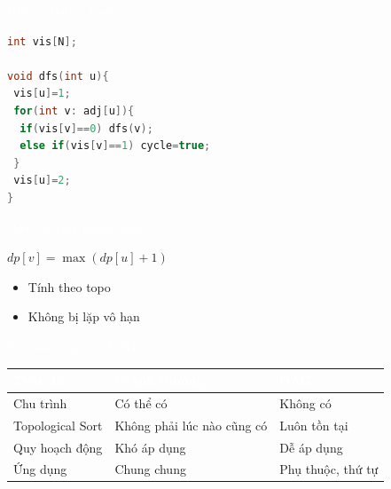 \documentclass{beamer}
\newcommand{\hlgreen}[1]{\textcolor{mygreen}{#1}}
\newcommand{\hlpurple}[1]{\textcolor{mypurple}{#1}}
\newcommand{\hlwhite}[1]{\textcolor{white}{#1}}
\begin{document}

\begin{frame}[fragile]{\hlwhite{DFS + Detect Cycle}}
\begin{lstlisting}[language=C++]
int vis[N];

void dfs(int u){
 vis[u]=1;
 for(int v: adj[u]){
  if(vis[v]==0) dfs(v);
  else if(vis[v]==1) cycle=true;
 }
 vis[u]=2;
}
\end{lstlisting}
\end{frame}


\begin{frame}{\hlwhite{DAG và Quy hoạch động}}
\begin{tcolorbox}
\centering
\hlpurple{$dp[v] = \max(dp[u] + 1)$}
\end{tcolorbox}

\begin{itemize}
\item Tính theo topo
\item Không bị lặp vô hạn
\end{itemize}
\end{frame}


\begin{frame}{\hlwhite{So sánh Graph và DAG}}
\centering
\renewcommand{\arraystretch}{1.5}

\begin{tabular}{|m{3cm}|m{4cm}|m{4cm}|}
\hline
\rowcolor{myblue!70}
\textcolor{white}{\textbf{Tiêu chí}} &
\textcolor{white}{\textbf{Graph thường}} &
\textcolor{white}{\textbf{DAG}} \\
\hline

Chu trình & Có thể có & \hlgreen{Không có} \\
\hline

Topological Sort & Không phải lúc nào cũng có & \hlgreen{Luôn tồn tại} \\
\hline

Quy hoạch động & Khó áp dụng & \hlgreen{Dễ áp dụng} \\
\hline

Ứng dụng & Chung chung & \hlgreen{Phụ thuộc, thứ tự} \\
\hline

\end{tabular}
\end{frame}
\end{document}
